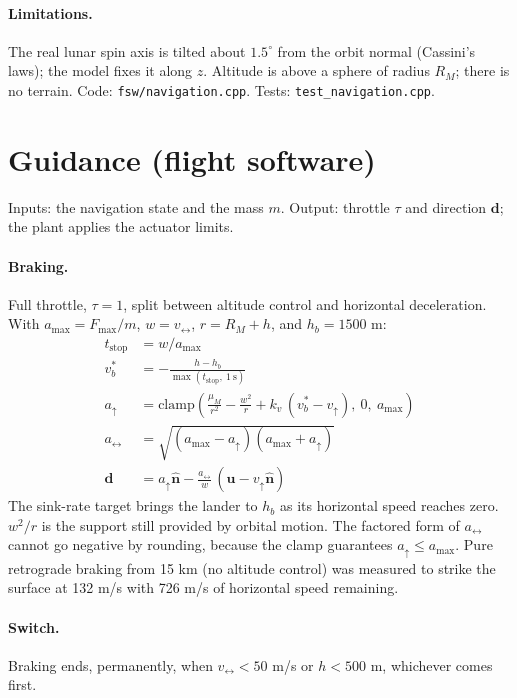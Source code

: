 \documentclass[11pt]{article}
\begin{document}
\paragraph{Limitations.} The real lunar spin axis is tilted about $1.5^\circ$ from the
orbit normal (Cassini's laws); the model fixes it along $z$. Altitude is above a sphere
of radius $R_M$; there is no terrain.
Code: \texttt{fsw/navigation.cpp}. Tests: \texttt{test\_navigation.cpp}.

\section{Guidance (flight software)}
Inputs: the navigation state and the mass $m$. Output: throttle $\tau$ and direction
$\mathbf{d}$; the plant applies the actuator limits.

\paragraph{Braking.} Full throttle, $\tau = 1$, split between altitude control and
horizontal deceleration. With $a_{\max} = F_{\max}/m$, $w = v_{\leftrightarrow}$,
$r = R_M + h$, and $h_b = 1500$ m:
\begin{align}
t_{\mathrm{stop}} &= w / a_{\max}\\
v^{*}_b &= -\frac{h - h_b}{\max(t_{\mathrm{stop}},\ 1\ \mathrm{s})}\\
a_{\uparrow} &= \mathrm{clamp}\!\left(\frac{\mu_M}{r^2} - \frac{w^2}{r} + k_v\,(v^{*}_b - v_{\uparrow}),\ 0,\ a_{\max}\right)\\
a_{\leftrightarrow} &= \sqrt{(a_{\max} - a_{\uparrow})(a_{\max} + a_{\uparrow})}\\
\mathbf{d} &= a_{\uparrow}\hat{\mathbf{n}} - \frac{a_{\leftrightarrow}}{w}\,(\mathbf{u} - v_{\uparrow}\hat{\mathbf{n}})
\end{align}
The sink-rate target brings the lander to $h_b$ as its horizontal speed reaches zero.
$w^2/r$ is the support still provided by orbital motion. The factored form of
$a_{\leftrightarrow}$ cannot go negative by rounding, because the clamp guarantees
$a_{\uparrow} \le a_{\max}$. Pure retrograde braking from 15 km (no altitude control)
was measured to strike the surface at 132 m/s with 726 m/s of horizontal speed remaining.

\paragraph{Switch.} Braking ends, permanently, when $v_{\leftrightarrow} < 50$ m/s or
$h < 500$ m, whichever comes first.
\end{document}
